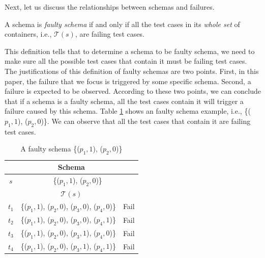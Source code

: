 

Next, let us discuss the relationships between schemas and failures.

\begin{definition}\label{de:faulty}
A schema is \emph{faulty schema} if and only if all the test cases in its \emph{whole set} of containers, i.e., $\mathcal{T}(s)$, are failing test cases.
\end{definition}

This definition tells that to determine a schema to be faulty schema, we need to make sure all the possible test cases that contain it must be failing test cases. The justifications of this definition of faulty schemas are two points. First, in this paper, the failure that we focus is triggered by some specific schema. Second, a failure is expected to be observed. According to these two points, we can conclude that if a schema is a faulty schema, all the test cases contain it will trigger a failure caused by this schema.  Table \ref{ex:faultyshema} shows an faulty schema example, i.e., \{($p_{1}, 1$), ($p_{2}, 0$)\}. We can observe that all the test cases that contain it are failing test cases.

\begin{table}[htbp]
  \centering
  \caption{A faulty schema \{($p_{1}, 1$), ($p_{2}, 0$)\}}
  \label{ex:faultyshema}
    \begin{tabular}{|c|c|c|}\hline
  \multicolumn{3}{|c|}{ \textbf{Schema}} \\ \hline
   $s$ &   \multicolumn{2}{|c|}{\{($p_{1}, 1$), ($p_{2}, 0$)\} } \\ \hline
  \multicolumn{3}{|c|}{ \textbf{ $\mathcal{T}(s)$ }}\\ \hline
    $t_{1}$ &   \{($p_{1}, 1$), ($p_{2}, 0$), ($p_{3}, 0$), ($p_{4}, 0$)\} & Fail \\
    $t_{2}$ &   \{($p_{1}, 1$), ($p_{2}, 0$), ($p_{3}, 0$), ($p_{4}, 1$)\} & Fail \\
    $t_{3}$ &   \{($p_{1}, 1$), ($p_{2}, 0$), ($p_{3}, 1$), ($p_{4}, 0$)\} & Fail \\
    $t_{4}$ &   \{($p_{1}, 1$), ($p_{2}, 0$), ($p_{3}, 1$), ($p_{4}, 1$)\} & Fail \\ \hline
    \end{tabular}
\end{table}%


